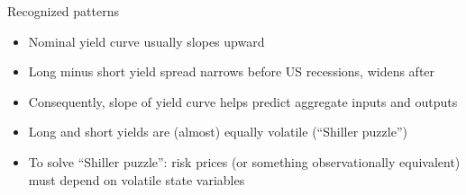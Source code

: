 \documentclass{beamer}
\theoremstyle{Definition}
\begin{document}
\begin{frame}{Recognized patterns}

\begin{itemize}
 \item Nominal yield curve  usually slopes upward
 \item Long minus short yield spread narrows before US recessions,  widens after
 \item Consequently,  slope of yield curve helps predict  aggregate inputs and outputs
\item Long and short yields  are (almost) equally volatile (``Shiller puzzle'')
\item To solve ``Shiller puzzle'':  risk prices (or something observationally equivalent) must  depend on  volatile state variables
\end{itemize}

\end{frame}

%
%
%
%
\end{document}
